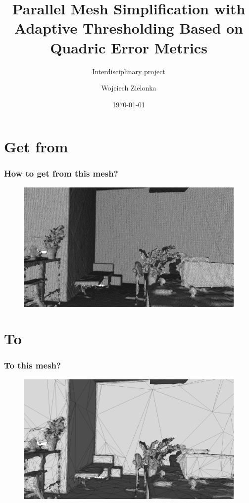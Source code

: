 \documentclass[
	10pt,
	t		%
]{beamer}
\title{Parallel Mesh Simplification with Adaptive Thresholding Based on Quadric Error Metrics}
\subtitle{Interdisciplinary project}
\author{Wojciech Zielonka}
\date{\today}
\begin{document}
\AddToShipoutPicture{\TitlePicture}
\maketitle
\ClearShipoutPicture
\AddToShipoutPicture{\BackgroundPicture}

\section{Get from}
\begin{frame}
\frametitle{How to get from this mesh?}
\begin{figure}[ht]
	\centering
    \includegraphics[width=1\textwidth]{from}
\end{figure}
\end{frame}

\section{To}
\begin{frame}
\frametitle{To this mesh?}
\begin{figure}[ht]
	\centering
    \includegraphics[width=1\textwidth]{to}
\end{figure}
\end{frame}
\end{document}
